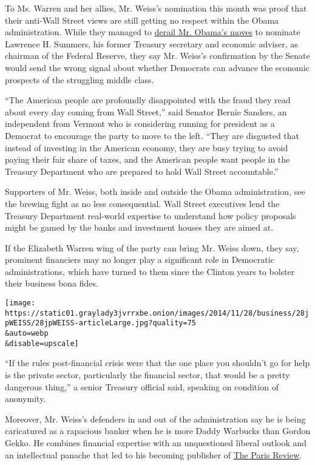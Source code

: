 To Ms. Warren and her allies, Mr. Weiss's nomination this month was
proof that their anti-Wall Street views are still getting no respect
within the Obama administration. While they managed to
\href{http://www.nytimes3xbfgragh.onion/2013/09/16/business/economy/summers-pulls-name-from-consideration-for-fed-chief.html}{derail
Mr. Obama's moves} to nominate Lawrence H. Summers, his former Treasury
secretary and economic adviser, as chairman of the Federal Reserve, they
say Mr. Weiss's confirmation by the Senate would send the wrong signal
about whether Democrats can advance the economic prospects of the
struggling middle class.

``The American people are profoundly disappointed with the fraud they
read about every day coming from Wall Street,'' said Senator Bernie
Sanders, an independent from Vermont who is considering running for
president as a Democrat to encourage the party to move to the left.
``They are disgusted that instead of investing in the American economy,
they are busy trying to avoid paying their fair share of taxes, and the
American people want people in the Treasury Department who are prepared
to hold Wall Street accountable.''

Supporters of Mr. Weiss, both inside and outside the Obama
administration, see the brewing fight as no less consequential. Wall
Street executives lend the Treasury Department real-world expertise to
understand how policy proposals might be gamed by the banks and
investment houses they are aimed at.

If the Elizabeth Warren wing of the party can bring Mr. Weiss down, they
say, prominent financiers may no longer play a significant role in
Democratic administrations, which have turned to them since the Clinton
years to bolster their business bona fides.

\texttt{[image: https://static01.graylady3jvrrxbe.onion/images/2014/11/28/business/28jpWEISS/28jpWEISS-articleLarge.jpg?quality=75\\\&auto=webp\\\&disable=upscale]}

``If the rules post-financial crisis were that the one place you
shouldn't go for help is the private sector, particularly the financial
sector, that would be a pretty dangerous thing,'' a senior Treasury
official said, speaking on condition of anonymity.

Moreover, Mr. Weiss's defenders in and out of the administration say he
is being caricatured as a rapacious banker when he is more Daddy
Warbucks than Gordon Gekko. He combines financial expertise with an
unquestioned liberal outlook and an intellectual panache that led to his
becoming publisher of \href{http://www.theparisreview.org/}{The Paris
Review}.

